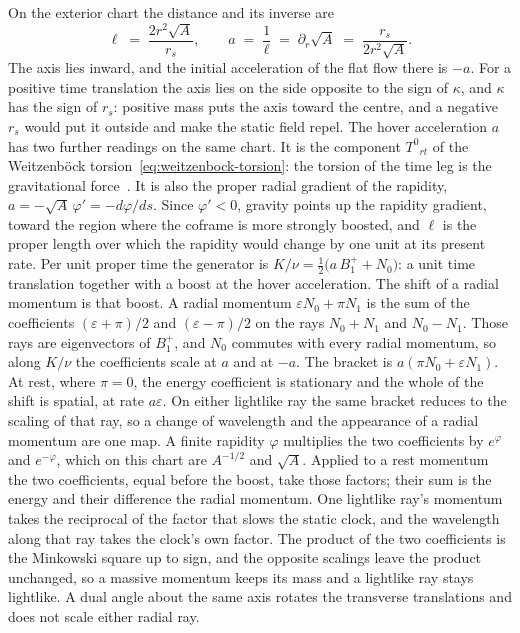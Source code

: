 \documentclass[a4paper]{article}
\begin{document}
On the exterior chart the distance and its inverse are
\[
\ell \;=\; \frac{2r^{2}\sqrt{A}}{r_{s}},\qquad
a \;=\; \frac{1}{\ell} \;=\; \partial_{r}\sqrt{A} \;=\; \frac{r_{s}}{2r^{2}\sqrt{A}}.
\]
The axis lies inward, and the initial acceleration of the flat flow there is \(-a\). For a positive time translation the axis lies on the side opposite to the sign of \(\kappa\), and \(\kappa\) has the sign of \(r_{s}\): positive mass puts the axis toward the centre, and a negative \(r_{s}\) would put it outside and make the static field repel. The hover acceleration \(a\) has two further readings on the same chart. It is the component \(T^{0}{}_{rt}\) of the Weitzenb\"{o}ck torsion~\eqref{eq:weitzenbock-torsion}: the torsion of the time leg is the gravitational force~\cite{AldrovandiPereira2013}. It is also the proper radial gradient of the rapidity, \(a=-\sqrt{A}\,\varphi'=-d\varphi/ds\). Since \(\varphi'<0\), gravity points up the rapidity gradient, toward the region where the coframe is more strongly boosted, and \(\ell\) is the proper length over which the rapidity would change by one unit at its present rate. Per unit proper time the generator is \(K/\nu=\tfrac12\bigl(a\,B^{+}_{1}+N_{0}\bigr)\): a unit time translation together with a boost at the hover acceleration. The shift of a radial momentum is that boost. A radial momentum \(\varepsilon N_{0}+\pi N_{1}\) is the sum of the coefficients \((\varepsilon+\pi)/2\) and \((\varepsilon-\pi)/2\) on the rays \(N_{0}+N_{1}\) and \(N_{0}-N_{1}\). Those rays are eigenvectors of \(B^{+}_{1}\), and \(N_{0}\) commutes with every radial momentum, so along \(K/\nu\) the coefficients scale at \(a\) and at \(-a\). The bracket is \(a(\pi N_{0}+\varepsilon N_{1})\). At rest, where \(\pi=0\), the energy coefficient is stationary and the whole of the shift is spatial, at rate \(a\varepsilon\). On either lightlike ray the same bracket reduces to the scaling of that ray, so a change of wavelength and the appearance of a radial momentum are one map. A finite rapidity \(\varphi\) multiplies the two coefficients by \(e^{\varphi}\) and \(e^{-\varphi}\), which on this chart are \(A^{-1/2}\) and \(\sqrt{A}\). Applied to a rest momentum the two coefficients, equal before the boost, take those factors; their sum is the energy and their difference the radial momentum. One lightlike ray's momentum takes the reciprocal of the factor that slows the static clock, and the wavelength along that ray takes the clock's own factor. The product of the two coefficients is the Minkowski square up to sign, and the opposite scalings leave the product unchanged, so a massive momentum keeps its mass and a lightlike ray stays lightlike. A dual angle about the same axis rotates the transverse translations and does not scale either radial ray.
\end{document}
